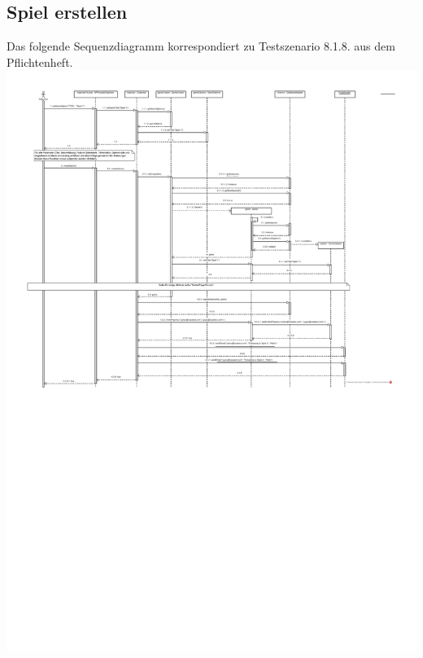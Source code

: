 \documentclass[a4paper]{scrreprt}
\begin{document}
	\subsection{Spiel erstellen}
	Das folgende Sequenzdiagramm korrespondiert zu Testszenario 8.1.8. aus dem Pflichtenheft. \\
	\includegraphics[width=\textwidth]{img/Spiel_erstellen.pdf}
\end{document}
